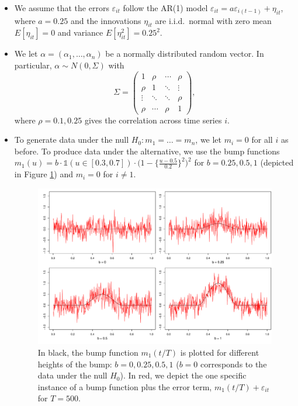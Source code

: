 \documentclass[a4paper,12pt]{article}
\begin{document}
\begin{enumerate}[label=\arabic*.,leftmargin=0.6cm]
{\begin{itemize}[topsep=0pt]
\begin{itemize}[label=--,leftmargin=0.45cm,itemsep=0pt]
\item We assume that the errors $\varepsilon_{it}$ follow the AR(1) model $\varepsilon_{it} = a \varepsilon_{i(t-1)} + \eta_{it}$, where $a=0.25$ and the innovations $\eta_{it}$ are i.i.d.\ normal with zero mean $E[\eta_{it}]=0$ and variance $E[\eta_{it}^2]=0.25^2$. 

\item We let $\alpha = (\alpha_1,\ldots,\alpha_n)$ be a normally distributed random vector. In particular, $\alpha \sim N(0,\Sigma)$ with
\[ \Sigma =
\begin{pmatrix}
1      & \rho   & \cdots & \rho   \\
\rho   & 1      & \ddots & \vdots \\
\vdots & \ddots & \ddots & \rho   \\
\rho   & \cdots & \rho   & 1
\end{pmatrix},
\]
where $\rho = 0.1, 0.25$ gives the correlation across time series $i$.

\item To generate data under the null $H_0: m_1 = \ldots = m_n$, we let $m_i = 0$ for all $i$ as before. To produce data under the alternative, we use the bump functions $m_1(u) = b \cdot \mathbb{1}(u \in [0.3, 0.7]) \cdot \big(1 - \big\{\frac{u - 0.5}{0.2}\big\}^2\big)^2$ for $b = 0.25, 0.5, 1$ (depicted in Figure \ref{fig:bump_function}) and $m_i = 0$ for $i \neq 1$.

\begin{figure}[t!]
\includegraphics[width=\textwidth]{output/bump_function.pdf}
\caption{In black, the bump function $m_1(t/T)$ is plotted for different heights of the bump: $b = 0, 0.25, 0.5, 1$ ($b= 0$ corresponds to the data under the null $H_0$). In red, we depict the one specific instance of a bump function plus the error term, $m_1(t/T) + \varepsilon_{it}$ for $T=500$.}\label{fig:bump_function}
\end{figure}


\end{itemize}
\end{itemize}}
\end{enumerate}
\end{document}
